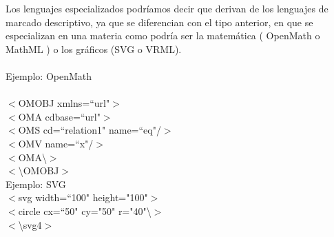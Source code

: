 Los lenguajes especializados podríamos decir que derivan de los lenguajes de marcado descriptivo, ya que se diferencian con el tipo anterior, en que se especializan en una materia como podría ser la matemática ( OpenMath o MathML ) \cite{noauthor_openmath_2017:e} \cite{noauthor_usos_2003:a} o los gráficos (SVG o VRML).
\\
\\
Ejemplo: OpenMath
\\
\\
$<$OMOBJ xmlns=``url"$>$
\\
 \tab $<$OMA cdbase=``url"$>$
 \\
    \tab\tab$<$OMS cd=``relation1" name=``eq"/$>$
    \\
   \tab\tab$<$OMV name=``x"/$>$
   \\
  \tab$<$OMA\textbackslash $>$
  \\
$<$\textbackslash OMOBJ$>$
\\
Ejemplo: SVG
\\
$<$svg width=``100" height="100"$>$
\\
  \tab$<$circle cx=``50" cy="50" r="40"\textbackslash $>$
  \\
$<$\textbackslash svg4$>$
\\




